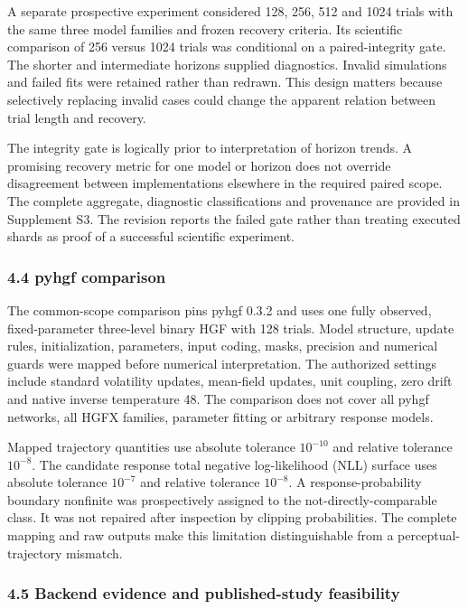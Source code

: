 \documentclass[
  11pt,
]{article}
\begin{document}
A separate prospective experiment considered 128, 256, 512 and 1024
trials with the same three model families and frozen recovery criteria.
Its scientific comparison of 256 versus 1024 trials was conditional on a
paired-integrity gate. The shorter and intermediate horizons supplied
diagnostics. Invalid simulations and failed fits were retained rather
than redrawn. This design matters because selectively replacing invalid
cases could change the apparent relation between trial length and
recovery.

The integrity gate is logically prior to interpretation of horizon
trends. A promising recovery metric for one model or horizon does not
override disagreement between implementations elsewhere in the required
paired scope. The complete aggregate, diagnostic classifications and
provenance are provided in Supplement S3. The revision reports the
failed gate rather than treating executed shards as proof of a
successful scientific experiment.

\subsubsection{4.4 pyhgf comparison}\label{pyhgf-comparison}

The common-scope comparison pins pyhgf 0.3.2 and uses one fully
observed, fixed-parameter three-level binary HGF with 128 trials. Model
structure, update rules, initialization, parameters, input coding,
masks, precision and numerical guards were mapped before numerical
interpretation. The authorized settings include standard volatility
updates, mean-field updates, unit coupling, zero drift and native
inverse temperature 48. The comparison does not cover all pyhgf
networks, all HGFX families, parameter fitting or arbitrary response
models.

Mapped trajectory quantities use absolute tolerance \(10^{-10}\) and
relative tolerance \(10^{-8}\). The candidate response total negative
log-likelihood (NLL) surface uses absolute tolerance \(10^{-7}\) and
relative tolerance \(10^{-8}\). A response-probability boundary
nonfinite was prospectively assigned to the not-directly-comparable
class. It was not repaired after inspection by clipping probabilities.
The complete mapping and raw outputs make this limitation
distinguishable from a perceptual-trajectory mismatch.

\subsubsection{4.5 Backend evidence and published-study
feasibility}\label{backend-evidence-and-published-study-feasibility}
\end{document}
